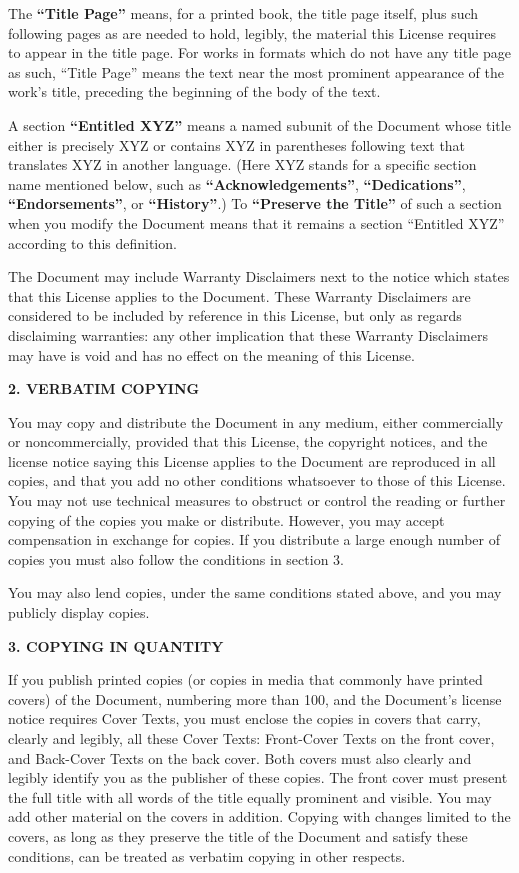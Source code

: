 \documentclass[a4paper,12pt,english]{sphinxmanual}
\begin{document}
The \textbf{``Title Page''} means, for a printed book, the title page itself,
plus such following pages as are needed to hold, legibly, the material
this License requires to appear in the title page. For works in formats
which do not have any title page as such, ``Title Page'' means the text
near the most prominent appearance of the work’s title, preceding the
beginning of the body of the text.

A section \textbf{``Entitled XYZ''} means a named subunit of the Document whose
title either is precisely XYZ or contains XYZ in parentheses following
text that translates XYZ in another language. (Here XYZ stands for a
specific section name mentioned below, such as \textbf{``Acknowledgements''},
\textbf{``Dedications''}, \textbf{``Endorsements''}, or \textbf{``History''}.) To \textbf{``Preserve
the Title''} of such a section when you modify the Document means that
it remains a section ``Entitled XYZ'' according to this definition.

The Document may include Warranty Disclaimers next to the notice which
states that this License applies to the Document. These Warranty
Disclaimers are considered to be included by reference in this License,
but only as regards disclaiming warranties: any other implication that
these Warranty Disclaimers may have is void and has no effect on the
meaning of this License.

\textbf{2. VERBATIM COPYING}

You may copy and distribute the Document in any medium, either
commercially or noncommercially, provided that this License, the
copyright notices, and the license notice saying this License applies to
the Document are reproduced in all copies, and that you add no other
conditions whatsoever to those of this License. You may not use
technical measures to obstruct or control the reading or further copying
of the copies you make or distribute. However, you may accept
compensation in exchange for copies. If you distribute a large enough
number of copies you must also follow the conditions in section 3.

You may also lend copies, under the same conditions stated above, and
you may publicly display copies.

\textbf{3. COPYING IN QUANTITY}

If you publish printed copies (or copies in media that commonly have
printed covers) of the Document, numbering more than 100, and the
Document’s license notice requires Cover Texts, you must enclose the
copies in covers that carry, clearly and legibly, all these Cover Texts:
Front-Cover Texts on the front cover, and Back-Cover Texts on the back
cover. Both covers must also clearly and legibly identify you as the
publisher of these copies. The front cover must present the full title
with all words of the title equally prominent and visible. You may add
other material on the covers in addition. Copying with changes limited
to the covers, as long as they preserve the title of the Document and
satisfy these conditions, can be treated as verbatim copying in other
respects.
\end{document}
